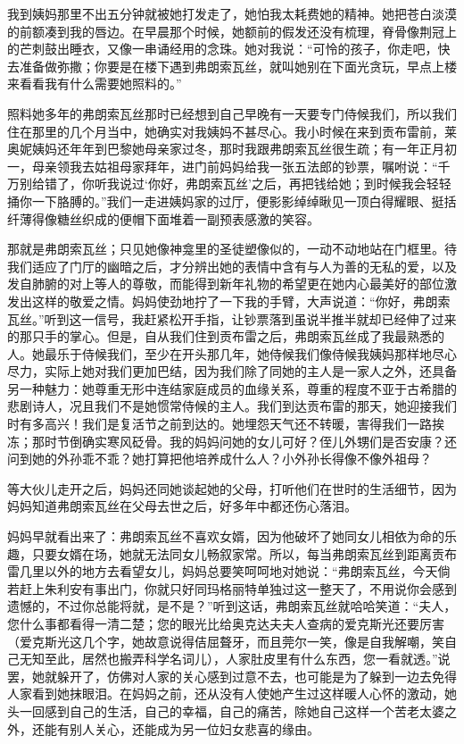 \par 我到姨妈那里不出五分钟就被她打发走了，她怕我太耗费她的精神。她把苍白淡漠的前额凑到我的唇边。在早晨那个时候，她额前的假发还没有梳理，脊骨像荆冠上的芒刺鼓出睡衣，又像一串诵经用的念珠。她对我说：“可怜的孩子，你走吧，快去准备做弥撒；你要是在楼下遇到弗朗索瓦丝，就叫她别在下面光贪玩，早点上楼来看看我有什么需要她照料的。”
\par 照料她多年的弗朗索瓦丝那时已经想到自己早晚有一天要专门侍候我们，所以我们住在那里的几个月当中，她确实对我姨妈不甚尽心。我小时候在来到贡布雷前，莱奥妮姨妈还年年到巴黎她母亲家过冬，那时我跟弗朗索瓦丝很生疏；有一年正月初一，母亲领我去姑祖母家拜年，进门前妈妈给我一张五法郎的钞票，嘱咐说：“千万别给错了，你听我说过‘你好，弗朗索瓦丝’之后，再把钱给她；到时候我会轻轻捅你一下胳膊的。”我们一走进姨妈家的过厅，便影影绰绰瞅见一顶白得耀眼、挺括纤薄得像糖丝织成的便帽下面堆着一副预表感激的笑容。
\par 那就是弗朗索瓦丝；只见她像神龛里的圣徒塑像似的，一动不动地站在门框里。待我们适应了门厅的幽暗之后，才分辨出她的表情中含有与人为善的无私的爱，以及发自肺腑的对上等人的尊敬，而能得到新年礼物的希望更在她内心最美好的部位激发出这样的敬爱之情。妈妈使劲地拧了一下我的手臂，大声说道：“你好，弗朗索瓦丝。”听到这一信号，我赶紧松开手指，让钞票落到虽说半推半就却已经伸了过来的那只手的掌心。但是，自从我们住到贡布雷之后，弗朗索瓦丝成了我最熟悉的人。她最乐于侍候我们，至少在开头那几年，她侍候我们像侍候我姨妈那样地尽心尽力，实际上她对我们更加巴结，因为我们除了同她的主人是一家人之外，还具备另一种魅力：她尊重无形中连结家庭成员的血缘关系，尊重的程度不亚于古希腊的悲剧诗人，况且我们不是她惯常侍候的主人。我们到达贡布雷的那天，她迎接我们时有多高兴！我们是复活节之前到达的。她埋怨天气还不转暖，害得我们一路挨冻；那时节倒确实寒风砭骨。我的妈妈问她的女儿可好？侄儿外甥们是否安康？还问到她的外孙乖不乖？她打算把他培养成什么人？小外孙长得像不像外祖母？
\par 等大伙儿走开之后，妈妈还同她谈起她的父母，打听他们在世时的生活细节，因为妈妈知道弗朗索瓦丝在父母去世之后，好多年中都还伤心落泪。
\par 妈妈早就看出来了：弗朗索瓦丝不喜欢女婿，因为他破坏了她同女儿相依为命的乐趣，只要女婿在场，她就无法同女儿畅叙家常。所以，每当弗朗索瓦丝到距离贡布雷几里以外的地方去看望女儿，妈妈总要笑呵呵地对她说：“弗朗索瓦丝，今天倘若赶上朱利安有事出门，你就只好同玛格丽特单独过这一整天了，不用说你会感到遗憾的，不过你总能将就，是不是？”听到这话，弗朗索瓦丝就哈哈笑道：“夫人，您什么事都看得一清二楚；您的眼光比给奥克达夫夫人查病的爱克斯光还要厉害（爱克斯光这几个字，她故意说得佶屈聱牙，而且莞尔一笑，像是自我解嘲，笑自己无知至此，居然也搬弄科学名词儿），人家肚皮里有什么东西，您一看就透。”说罢，她就躲开了，仿佛对人家的关心感到过意不去，也可能是为了躲到一边去免得人家看到她抹眼泪。在妈妈之前，还从没有人使她产生过这样暖人心怀的激动，她头一回感到自己的生活，自己的幸福，自己的痛苦，除她自己这样一个苦老太婆之外，还能有别人关心，还能成为另一位妇女悲喜的缘由。
